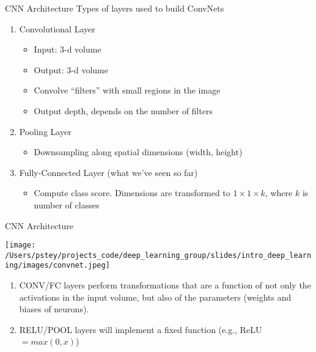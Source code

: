\documentclass[pdf]{beamer}
\begin{document}
	\begin{frame}{CNN Architecture}
	Types of layers used to build ConvNets
	
	\vspace{1em}
	
	\begin{enumerate}
		\item Convolutional Layer
			\begin{itemize}
				\item Input: 3-d volume
				\item Output: 3-d volume
				\item Convolve ``filters'' with small regions in the image
				\item Output depth, depends on the number of filters
			\end{itemize}
		\item Pooling Layer
			\begin{itemize}
				\item Downsampling along spatial dimensions (width, height)
			\end{itemize}
		\item Fully-Connected Layer (what we've seen so far)
			\begin{itemize}
				\item Compute class score. Dimensions are transformed to $1 \times 1 \times k$, where $k$ is number of classes 
			\end{itemize}
		
	\end{enumerate}
	\end{frame}	


	\begin{frame}{CNN Architecture}
	\begin{center}
		\texttt{[image: /Users/pstey/projects\_code/deep\_learning\_group/slides/intro\_deep\_learning/images/convnet.jpeg]}
	\end{center}

	\vspace{1em}
	
	\begin{enumerate}
		\item CONV/FC layers perform transformations that are a function of not only the activations in the input volume, but also of the parameters (weights and biases of neurons).
		\item RELU/POOL layers will implement a fixed function (e.g., ReLU $= max(0, x)$)
	\end{enumerate}
	\end{frame}
\end{document}
